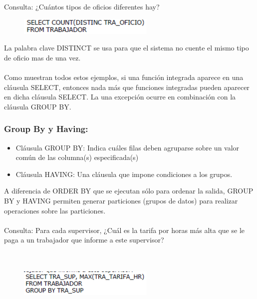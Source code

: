 \documentclass[preprint,12pt]{elsarticle}
\begin{document}
Consulta: ¿Cuántos tipos de oficios diferentes hay?

	\begin{figure}[htb]
		\begin{center}
			\includegraphics[width=6.5cm]{./IMAGENES/funintegrada4}
		\end{center}
	\end{figure}

La palabra clave DISTINCT se usa para que el sistema no cuente el mismo tipo de oficio mas de una vez. \\ \\Como muestran todos estos ejemplos, si una función integrada aparece en una cláusula SELECT, entonces nada más que funciones integradas pueden aparecer en dicha cláusula SELECT. La una excepción ocurre en combinación con la cláusula GROUP BY.

\subsubsection{\textbf{Group By y Having:}}
\begin{itemize}
\item Cláusula GROUP BY: Indica cuáles filas deben agruparse sobre un valor común de las columna(s) especificada(s) 
\item Cláusula HAVING: Una cláusula que impone condiciones a los grupos.
\end{itemize}
A diferencia de ORDER BY que se ejecutan sólo para ordenar la salida, GROUP BY y HAVING permiten generar particiones (grupos de datos) para realizar operaciones sobre las particiones. \\ \\Consulta: Para cada supervisor, ¿Cuál es la tarifa por horas más alta que se le paga a
un trabajador que informe a este supervisor?\\ \\ \\

	\begin{figure}[htb]
		\begin{center}
			\includegraphics[width=6.5cm]{./IMAGENES/group1}
		\end{center}
	\end{figure}
\end{document}
